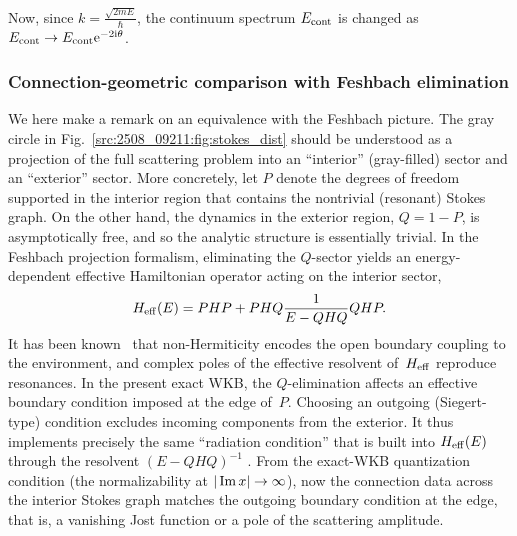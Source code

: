 Now, since $k=\frac{\sqrt{2m E}}{\hbar}$, the continuum spectrum $E_{\mathrm{cont}}$
is changed as $E_{\mathrm{cont}}\to E_{\mathrm{cont}} \mathrm{e}^{-2\mathrm{i} \theta}$.
\subsubsection{Connection-geometric comparison with Feshbach elimination}
We here make a remark on an equivalence with the Feshbach picture.
The gray circle in Fig.~\ref{src:2508_09211:fig:stokes_dist} should be understood as a projection of the full scattering problem into an ``interior'' (gray-filled) sector and an ``exterior'' sector.
More concretely, let $P$ denote the degrees of freedom supported in the interior region that contains the nontrivial (resonant) Stokes graph.
On the other hand, the dynamics in the exterior region, $Q=1-P$, is asymptotically free, and so the analytic structure is essentially trivial.
In the Feshbach projection formalism, eliminating the $Q$-sector yields an energy-dependent effective Hamiltonian operator acting on the interior sector,
\begin{align}
  H_{\mathrm{eff}}(E)=PHP + PHQ\frac{1}{E-QHQ}QHP .
\end{align}
It has been known~\cite{Feshbach1958UnifiedI,Feshbach1962UnifiedII,Rotter:2007zng} that non-Hermiticity encodes the open boundary coupling to the environment, and complex poles of the effective resolvent of~$H_{\mathrm{eff}}$ reproduce resonances.
In the present exact WKB, the $Q$-elimination affects an effective boundary condition imposed at the edge of~$P$.
Choosing an outgoing (Siegert-type) condition excludes incoming components from the exterior. It thus implements precisely the same ``radiation condition'' that is built into $H_{\mathrm{eff}}(E)$ through the resolvent $(E-QHQ)^{-1}$ \cite{Hatano:2013nyz}.
From the exact-WKB quantization condition (the normalizability at $|\operatorname{Im} x|\to\infty$), now the connection data across the interior Stokes graph matches the outgoing boundary condition at the edge, that is, a vanishing Jost function or a pole of the scattering amplitude.
